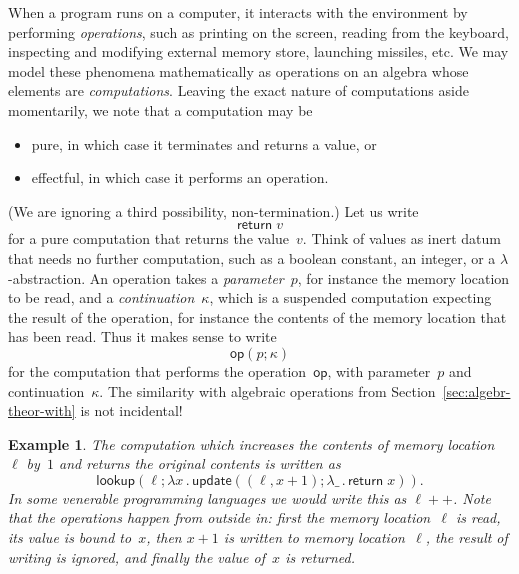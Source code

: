 \documentclass{amsart}
\newcommand{\lam}[1]{\lambda #1 \,.\,}
\newcommand{\kode}[1]{\mathsf{#1}}
\newcommand{\opcall}[3]{\kode{#1}(#2; #3)}
\newcommand{\return}[1]{\kode{return}\;#1}
\newtheorem{example}[definition]{Example}
\begin{document}
When a program runs on a computer, it interacts with the environment by
performing \emph{operations}, such as printing on the screen, reading from the
keyboard, inspecting and modifying external memory store, launching missiles,
etc. We may model these phenomena mathematically as operations on an algebra
whose elements are \emph{computations}. Leaving the exact nature of computations
aside momentarily, we note that a computation may be
%
\begin{itemize}
\item pure, in which case it terminates and returns a value, or
\item effectful, in which case it performs an operation.
\end{itemize}
%
(We are ignoring a third possibility, non-termination.) Let us write
%
\begin{equation*}
  \return{v}
\end{equation*}
%
for a pure computation that returns the value~$v$. Think of values as inert
datum that needs no further computation, such as a boolean constant, an integer,
or a $\lambda$-abstraction. An operation takes a \emph{parameter}~$p$, for
instance the memory location to be read, and a \emph{continuation}~$\kappa$,
which is a suspended computation expecting the result of the operation, for
instance the contents of the memory location that has been read. Thus it makes
sense to write
%
\begin{equation*}
  \opcall{op}{p}{\kappa}
\end{equation*}
%
for the computation that performs the operation~$\kode{op}$, with parameter~$p$
and continuation~$\kappa$. The similarity with algebraic operations from
Section~\ref{sec:algebr-theor-with} is not incidental!

\begin{example}
  The computation which increases the contents of memory location~$\ell$ by~$1$
  and returns the original contents is written as
  \begin{equation*}
    \opcall{lookup}{\ell}{
    \lam{x} \opcall{update}{(\ell,x + 1)}{
    \lam{\_} \return{x}
    }
    }.
  \end{equation*}
  In some venerable programming languages we would write this as $\ell{+}{+}$.
  Note that the operations happen from outside in: first the memory
  location~$\ell$ is read, its value is bound to~$x$, then $x + 1$ is written to
  memory location~$\ell$, the result of writing is ignored, and finally the
  value of~$x$ is returned.
\end{example}
\end{document}
